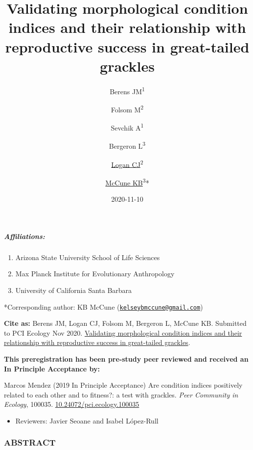 \documentclass[
]{article}
\title{Validating morphological condition indices and their relationship with
reproductive success in great-tailed grackles}
\author{Berens JM\textsuperscript{1} \and Folsom M\textsuperscript{2} \and Sevchik A\textsuperscript{1} \and Bergeron L\textsuperscript{3} \and \href{http://CorinaLogan.com}{Logan CJ}\textsuperscript{2} \and \href{https://www.kelseymccune.com/}{McCune KB}\textsuperscript{3}*}
\date{2020-11-10}
\providecommand{\tightlist}{%
  \setlength{\itemsep}{0pt}\setlength{\parskip}{0pt}}
\begin{document}
\maketitle

\hypertarget{affiliations}{%
\subparagraph{Affiliations:}\label{affiliations}}

\begin{enumerate}
\def\labelenumi{\arabic{enumi})}
\tightlist
\item
  Arizona State University School of Life Sciences
\item
  Max Planck Institute for Evolutionary Anthropology
\item
  University of California Santa Barbara
\end{enumerate}

*Corresponding author: KB McCune
(\href{mailto:kelseybmccune@gmail.com}{\nolinkurl{kelseybmccune@gmail.com}})

\textbf{Cite as:} Berens JM, Logan CJ, Folsom M, Bergeron L, McCune KB.
Submitted to PCI Ecology Nov 2020.
\href{http://corinalogan.com/Preregistrations/gcondition.html}{Validating
morphological condition indices and their relationship with reproductive
success in great-tailed grackles}.

\textbf{This preregistration has been pre-study peer reviewed and
received an In Principle Acceptance by:}

Marcos Mendez (2019 In Principle Acceptance) Are condition indices
positively related to each other and to fitness?: a test with grackles.
\emph{Peer Community in Ecology}, 100035.
\href{https://doi.org/10.24072/pci.ecology.100035}{10.24072/pci.ecology.100035}

\begin{itemize}
\tightlist
\item
  Reviewers: Javier Seoane and Isabel López-Rull
\end{itemize}

\hypertarget{abstract}{%
\subsubsection{ABSTRACT}\label{abstract}}
\end{document}
